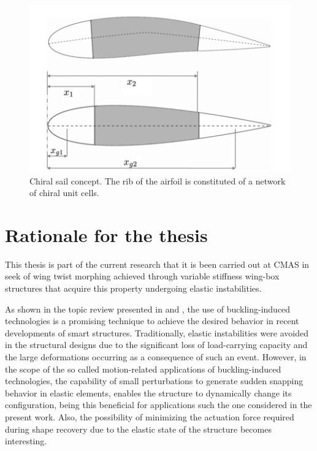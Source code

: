   \begin{figure}[!htpb]
    \centering
    \includegraphics[width=0.8 \textwidth]{figures/state-of-the-art/chiral-sail}
    \caption[Chiral sail concept]{Chiral sail concept. The rib of the airfoil is constituted of a network of chiral unit cells. \cite{Airoldi2012}}\label{fig:chiral-sail}
  \end{figure}  

\clearpage
\section{Rationale for the thesis} \label{sec:rationale_state}

  This thesis is part of the current research that it is been carried out at CMAS in seek of wing twist morphing achieved through variable stiffness wing-box structures that acquire this property undergoing elastic instabilities. 

  As shown in the topic review presented in \cite{Hu2015} and \cite{Reis2015}, the use of buckling-induced technologies is a promising technique to achieve the desired behavior in recent developments of smart structures. Traditionally, elastic instabilities were avoided in the structural designs due to the significant loss of load-carrying capacity and the large deformations occurring as a consequence of such an event. However, in the scope of the so called motion-related applications of buckling-induced technologies, the capability of small perturbations to generate sudden snapping behavior in elastic elements, enables the structure to dynamically change its configuration, being this beneficial for applications such the one considered in the present work. Also, the possibility of minimizing the actuation force required during shape recovery due to the elastic state of the structure becomes interesting.

